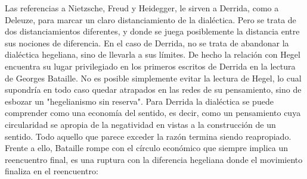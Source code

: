 \documentclass{book}
\begin{document}
Las referencias a Nietzsche, Freud y Heidegger, le sirven a Derrida,
como a Deleuze, para marcar un claro distanciamiento de la dialéctica.
Pero se trata de dos distanciamientos diferentes, y donde se juega
posiblemente la distancia entre sus nociones de diferencia. En el caso
de Derrida, no se trata de abandonar la dialéctica hegeliana, sino de
llevarla a sus límites. De hecho la relación con Hegel encuentra su
lugar privilegiado en los primeros escritos de Derrida en la lectura de
Georges Bataille. No es posible simplemente evitar la lectura de Hegel,
lo cual supondría en todo caso quedar atrapados en las redes de su
pensamiento, sino de esbozar un "hegelianismo sin reserva". Para Derrida
la dialéctica se puede comprender como una economía del sentido, es
decir, como un pensamiento cuya circularidad se apropia de la
negatividad en vistas a la construcción de un sentido. Todo aquello que
parece exceder la razón termina siendo reapropiado. Frente a ello,
Bataille rompe con el círculo económico que siempre implica un
reencuentro final, es una ruptura con la diferencia hegeliana donde el
movimiento finaliza en el reencuentro:
\end{document}
